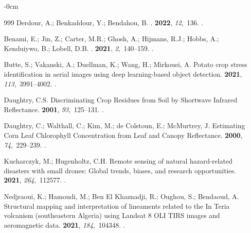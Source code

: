 \documentclass[asi,article,accept,pdftex,moreauthors]{Definitions/mdpi}
\begin{document}
\begin{adjustwidth}{-\extralength}{0cm}
\begin{thebibliography}{999}
Derdour, A.; Benkaddour, Y.; Bendahou, B.
.
 {\bf 2022}, {\em 12},~136.
.

Benami, E.; Jin, Z.; Carter, M.R.; Ghosh, A.; Hijmans, R.J.; Hobbs, A.;
  Kenduiywo, B.; Lobell, D.B.
.
 {\bf 2021}, {\em
  2},~140--159.
.

Butte, S.; Vakanski, A.; Duellman, K.; Wang, H.; Mirkouei, A.
\newblock Potato crop stress identification in aerial images using deep
  learning-based object detection.
 {\bf 2021}, {\em 113},~3991--4002.
.

Daughtry, C.S.
\newblock Discriminating Crop Residues from Soil by Shortwave Infrared
  Reflectance.
 {\bf 2001}, {\em 93},~125--131.
.

Daughtry, C.; Walthall, C.; Kim, M.; {de Colstoun}, E.; McMurtrey, J.
\newblock Estimating Corn Leaf Chlorophyll Concentration from Leaf and Canopy
  Reflectance.
 {\bf 2000}, {\em 74},~229--239.
.

Kucharczyk, M.; Hugenholtz, C.H.
\newblock Remote sensing of natural hazard-related disasters with small drones:
  Global trends, biases, and research opportunities.
 {\bf 2021}, {\em 264},~112577.
.

Nedjraoui, K.; Hamoudi, M.; {Ben El Khaznadji}, R.; Oughou, S.; Bendaoud, A.
\newblock Structural mapping and interpretation of lineaments related to the In
  Teria volcanism (southeastern Algeria) using Landsat 8 OLI TIRS images and
  aeromagnetic data.
 {\bf 2021}, {\em
  184},~104348.
.


\end{thebibliography}
\end{adjustwidth}
\end{document}

